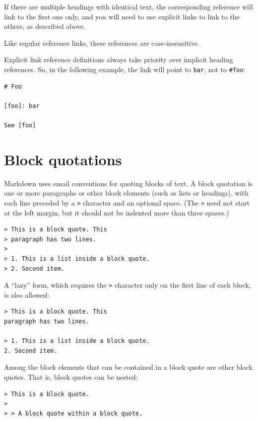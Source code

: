 \documentclass[
  b5paper
]{book}
\begin{document}
If there are multiple headings with identical text, the corresponding
reference will link to the first one only, and you will need to use
explicit links to link to the others, as described above.

Like regular reference links, these references are case-insensitive.

Explicit link reference definitions always take priority over implicit
heading references. So, in the following example, the link will point to
\texttt{bar}, not to \texttt{\#foo}:

\begin{verbatim}
# Foo

[foo]: bar

See [foo]
\end{verbatim}

\section{Block quotations}\label{block-quotations}

Markdown uses email conventions for quoting blocks of text. A block
quotation is one or more paragraphs or other block elements (such as
lists or headings), with each line preceded by a \texttt{\textgreater{}}
character and an optional space. (The \texttt{\textgreater{}} need not
start at the left margin, but it should not be indented more than three
spaces.)

\begin{verbatim}
> This is a block quote. This
> paragraph has two lines.
>
> 1. This is a list inside a block quote.
> 2. Second item.
\end{verbatim}

A ``lazy'' form, which requires the \texttt{\textgreater{}} character
only on the first line of each block, is also allowed:

\begin{verbatim}
> This is a block quote. This
paragraph has two lines.

> 1. This is a list inside a block quote.
2. Second item.
\end{verbatim}

Among the block elements that can be contained in a block quote are
other block quotes. That is, block quotes can be nested:

\begin{verbatim}
> This is a block quote.
>
> > A block quote within a block quote.
\end{verbatim}
\end{document}
